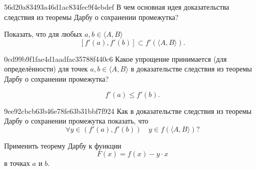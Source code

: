 
\begin{note}{56d20a83493a46d1ac834fec9f4ebdef}
    В чем основная идея доказательства следствия из теоремы Дарбу о сохранении промежутка?

    \begin{cloze}{1}
        Показать, что для любых \( a, b \in \langle A, B \rangle  \)
        \[
            [f'(a), f'(b)] \subset f'(\langle A, B \rangle ).
        \]
    \end{cloze}
\end{note}

\begin{note}{0cd99b9f1fae4d1aadfac35788f440c6}
    Какое упрощение принимается (для определённости) для точек \( a, b \in \langle A, B \rangle  \) в доказательстве следствия из теоремы Дарбу о сохранении промежутка?

    \begin{cloze}{1}
        \[
            f'(a) \leqslant f'(b).
        \]
    \end{cloze}
\end{note}

\begin{note}{9ee92cbcb63b46e78fe63b31bbf7f924}
    Как в доказательстве следствия из теоремы Дарбу о сохранении промежутка показать, что
    \[
        \forall y \in (f'(a), f'(b)) \quad y \in f(\langle A, B \rangle )?
    \]

    \begin{cloze}{1}
        Применить теорему Дарбу к функции
        \[
            F(x) = f(x) - y \cdot x
        \]
        в точках \( a \) и \( b \).
    \end{cloze}
\end{note}

